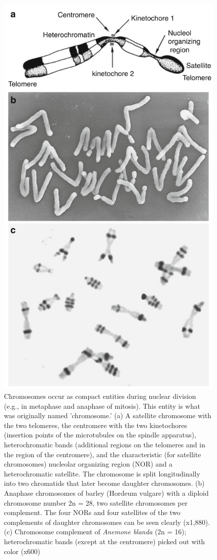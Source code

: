 \documentclass[11pt,dvipsnames,ignorenonframetext,aspectratio=169]{beamer}
\begin{document}
\begin{frame}{}
\protect\hypertarget{section-4}{}

\begin{figure}
\includegraphics[width=0.22\linewidth]{../images/chromosome_structure} \caption{Chromosomes occur as compact entities during nuclear division (e.g., in metaphase and anaphase of mitosis). This entity is what was originally named 'chromosome.' (a) A satellite chromosome with the two telomeres, the centromere with the two kinetochores (insertion points of the microtubules on the spindle apparatus), heterochromatic bands (additional regions on the telomeres and in the region of the centromere), and the characteristic (for satellite chromosomes) nucleolar organizing region (NOR) and a heterochromatic satellite. The chromosome is split longitudinally into two chromatids that later become daughter chromosomes. (b) Anaphase chromosomes of barley (Hordeum vulgare) with a diploid chromosome number 2n = 28, two satellite chromosomes per complement. The four NORs and four satellites of the two complements of daughter chromosomes can be seen clearly (x1,880). (c) Chromosome complement of \textit{Anemone blanda} (2n = 16); heterochromatic bands (except at the centromere) picked out with color (x600)}\label{fig:chromosome-structure}
\end{figure}

\end{frame}
\end{document}
